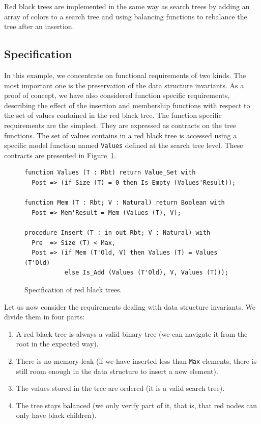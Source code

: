 \documentclass{llncs}
\begin{document}
Red black trees are implemented in the same way as search trees by adding an array of
colors to a search tree and using balancing functions to rebalance the tree after an insertion.

\subsection{Specification}

In this example, we concentrate on functional requirements of two kinds. The most important one is the
preservation of the data structure invariants. As a proof of concept, we have also considered
function specific requirements, describing the effect of the insertion and membership functions with
respect to the set of values contained in the red black tree. The function specific requirements are the
simplest. They are expressed as contracts on the tree functions. The set of values contains in a red black
tree is accessed using a specific model function named \texttt{Values} defined at the search tree level.
These contracts are presented in Figure~\ref{fig-rbt-spec}.

\begin{figure}[ht]
\begin{small}
\begin{lstlisting}
function Values (T : Rbt) return Value_Set with
  Post => (if Size (T) = 0 then Is_Empty (Values'Result));

function Mem (T : Rbt; V : Natural) return Boolean with
  Post => Mem'Result = Mem (Values (T), V);

procedure Insert (T : in out Rbt; V : Natural) with
  Pre  => Size (T) < Max,
  Post => (if Mem (T'Old, V) then Values (T) = Values (T'Old)
           else Is_Add (Values (T'Old), V, Values (T)));
\end{lstlisting}
\end{small}
\caption{\label{fig-rbt-spec} Specification of red black trees.}
\end{figure}

Let us now consider the requirements dealing with data structure invariants. We divide them in four parts:

\begin{enumerate}
 \item A red black tree is always a valid binary tree (we can navigate it from the root in the expected way).
 \item There is no memory leak (if we have inserted less than \texttt{Max} elements, there is still room
 enough in the data structure to insert a new element).
 \item The values stored in the tree are ordered (it is a valid search tree).
 \item The tree stays balanced (we only verify part of it, that is, that red nodes can only have black children).
\end{enumerate}
\end{document}
